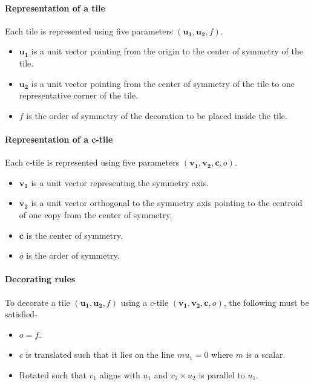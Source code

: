 \documentclass[11pt]{article}
\newcommand{\1}{\mathds{1}}
\begin{document}
\paragraph{Representation of a tile} Each tile is represented using five parameters $(\mathbf{u_1}, \mathbf{u_2}, f)$.
  \begin{itemize}  
    \item $\mathbf{u_1}$ is a unit vector pointing from the origin to the center of symmetry of the tile.
    \item $\mathbf{u_2}$ is a unit vector pointing from the center of symmetry of the tile to one representative corner of the tile.
    \item $f$ is the order of symmetry of the decoration to be placed inside the tile.
  \end{itemize}


\paragraph{Representation of a c-tile} Each $c$-tile is represented using five parameters $(\mathbf{v_1}, \mathbf{v_2}, \mathbf{c}, o)$.
    \begin{itemize}  
      \item $\mathbf{v_1}$ is a unit vector representing the symmetry axis.
      \item $\mathbf{v_2}$ is a unit vector orthogonal to the symmetry axis pointing to the centroid of one copy from the center of symmetry.
      \item $\mathbf{c}$ is the center of symmetry.
      \item $o$ is the order of symmetry.
    \end{itemize}

\paragraph{Decorating rules}
To decorate a tile $(\mathbf{u_1}, \mathbf{u_2}, f)$ using a $c$-tile $(\mathbf{v_1}, \mathbf{v_2}, \mathbf{c}, o)$, the following must be satisfied-
\begin{itemize}
 \item $o = f$.
 \item $c$ is translated such that it lies on the line $m{u_1}=0$ where $m$ is a scalar.
 \item Rotated such that $v_1$ aligns with $u_1$ and $v_2 \times u_2$ is parallel to $u_1$.
\end{itemize}
\end{document}
